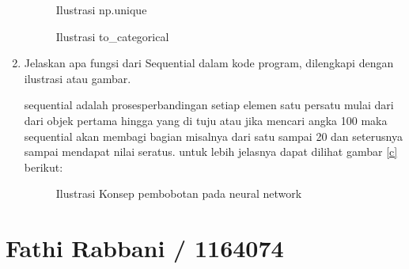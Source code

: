 \begin{enumerate}
\begin{figure}[!htbp]
      \caption{Ilustrasi  np.unique}
      \label{c119}
      \end{figure}

\begin{figure}[!htbp]
      \caption{Ilustrasi to\_categorical}
      \label{c120}
      \end{figure}

\item Jelaskan apa fungsi dari Sequential dalam kode program, dilengkapi dengan ilustrasi atau gambar. \par
sequential adalah prosesperbandingan setiap elemen satu persatu mulai dari dari objek pertama hingga yang di tuju atau jika mencari angka 100 maka sequential akan membagi bagian misalnya dari satu sampai 20 dan seterusnya sampai mendapat nilai seratus. untuk lebih jelasnya dapat dilihat gambar \ref{c}  berikut:

\begin{figure}[!htbp]
      \caption{Ilustrasi Konsep pembobotan pada neural network}
      \label{c121}
      \end{figure}

\end{enumerate}

\section{Fathi Rabbani / 1164074}
